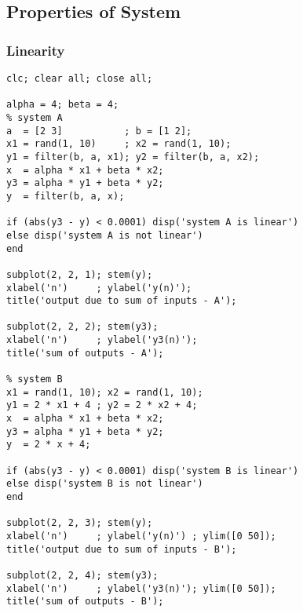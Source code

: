 \documentclass[12pt]{article}
\begin{document}
\subsection{Properties of System}
\subsubsection{Linearity}
\begin{verbatim}
clc; clear all; close all;

alpha = 4; beta = 4;
% system A
a  = [2 3]           ; b = [1 2];
x1 = rand(1, 10)     ; x2 = rand(1, 10);
y1 = filter(b, a, x1); y2 = filter(b, a, x2);
x  = alpha * x1 + beta * x2;
y3 = alpha * y1 + beta * y2;
y  = filter(b, a, x);

if (abs(y3 - y) < 0.0001) disp('system A is linear')
else disp('system A is not linear')
end

subplot(2, 2, 1); stem(y);
xlabel('n')     ; ylabel('y(n)');
title('output due to sum of inputs - A');

subplot(2, 2, 2); stem(y3);
xlabel('n')     ; ylabel('y3(n)');
title('sum of outputs - A');

% system B
x1 = rand(1, 10); x2 = rand(1, 10);
y1 = 2 * x1 + 4 ; y2 = 2 * x2 + 4;
x  = alpha * x1 + beta * x2;
y3 = alpha * y1 + beta * y2;
y  = 2 * x + 4;

if (abs(y3 - y) < 0.0001) disp('system B is linear')
else disp('system B is not linear')
end

subplot(2, 2, 3); stem(y);
xlabel('n')     ; ylabel('y(n)') ; ylim([0 50]);
title('output due to sum of inputs - B');

subplot(2, 2, 4); stem(y3);
xlabel('n')     ; ylabel('y3(n)'); ylim([0 50]);
title('sum of outputs - B');
\end{verbatim}
\end{document}
